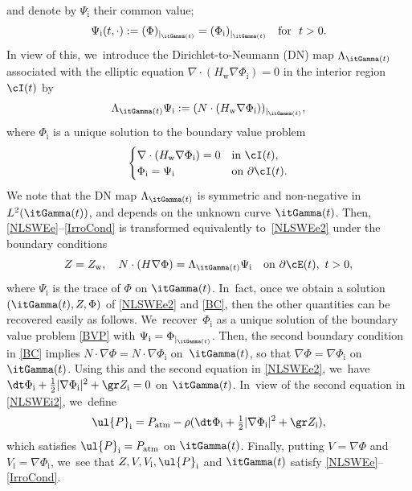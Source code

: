 and denote by $\Psi_\mathrm{i}$ their common value;
\begin{equation}\label{ContPhi}
\Psi_\mathrm{i}(t,\cdot):= (\Phi)_{\vert_{ \itGamma(t)}}=(\Phi_\mathrm{i})_{\vert_{ \itGamma(t)}} \quad\text{for } \ t>0.
\end{equation}
In view of this, we~introduce the Dirichlet-to-Neumann (DN) map $\Lambda_{\itGamma(t)}$ associated with the elliptic equation
$\nabla\cdot(H_\mathrm{w}\nabla\Phi_\mathrm{i})=0$ in the interior region $\cI(t)$ by
\begin{equation}\label{defDN}
\Lambda_{\itGamma(t)} \Psi_\mathrm{i}:= (N\cdot (H_\mathrm{w}\nabla\Phi_\mathrm{i}))_{\vert_{\itGamma(t)}},
\end{equation}
where $\Phi_\mathrm{i}$ is a unique solution to the boundary value problem
\begin{equation}\label{BVP}
\begin{cases}
\nabla\cdot(H_\mathrm{w}\nabla\Phi_\mathrm{i})=0 &\text{in } \cI(t), \\
\Phi_\mathrm{i}=\Psi_\mathrm{i} &\text{on } \partial\cI(t).
\end{cases}
\end{equation}
We note that the DN map $\Lambda_{\itGamma(t)}$ is symmetric and non-negative in $L^2(\itGamma(t))$, and depends on the unknown curve $\itGamma(t)$.
Then, \eqref{NLSWEe}--\eqref{IrroCond} is transformed equivalently to~\eqref{NLSWEe2} under the boundary conditions
\begin{equation}\label{BC}
Z=Z_\mathrm{w}, \quad N\cdot(H\nabla\Phi)=\Lambda_{\itGamma(t)}\Psi_\mathrm{i} \quad\text{on } \partial\cE(t), \ t>0,
\end{equation}
where $\Psi_\mathrm{i}$ is the trace of $\Phi$ on $\itGamma(t)$. In~fact, once we obtain a solution $(\itGamma(t),Z,\Phi)$ of \eqref{NLSWEe2} and \eqref{BC}, then the other quantities can be recovered easily as follows. We~recover~$\Phi_\mathrm{i}$ as a unique solution of the boundary value problem \eqref{BVP} with $\Psi_\mathrm{i}=\Phi_{\vert_{\itGamma(t)}}$.
Then, the second boundary condition in \eqref{BC} implies $N\cdot\nabla\Phi=N\cdot\nabla\Phi_\mathrm{i}$ on~$\itGamma(t)$,
so that $\nabla\Phi=\nabla\Phi_\mathrm{i}$ on $\itGamma(t)$.
Using this and the second equation in \eqref{NLSWEe2}, we~have $\dt\Phi_\mathrm{i} + \frac12|\nabla\Phi_\mathrm{i}|^2 + \gr Z_\mathrm{i} = 0$ on $\itGamma(t)$. In~view of the second equation in \eqref{NLSWEi2}, we~define
\begin{equation}\label{defPi}
\ul{P}_\mathrm{i}=P_\mathrm{atm}-\rho(\dt\Phi_\mathrm{i} + \tfrac12|\nabla\Phi_\mathrm{i}|^2 + \gr Z_\mathrm{i}),
\end{equation}
which satisfies $\ul{P}_\mathrm{i}=P_\mathrm{atm}$ on $\itGamma(t)$.
Finally, putting $V=\nabla\Phi$ and $V_\mathrm{i}=\nabla\Phi_\mathrm{i}$, we~see that $Z,V,V_\mathrm{i},\ul{P}_\mathrm{i}$ and $\itGamma(t)$ satisfy \eqref{NLSWEe}--\eqref{IrroCond}.

